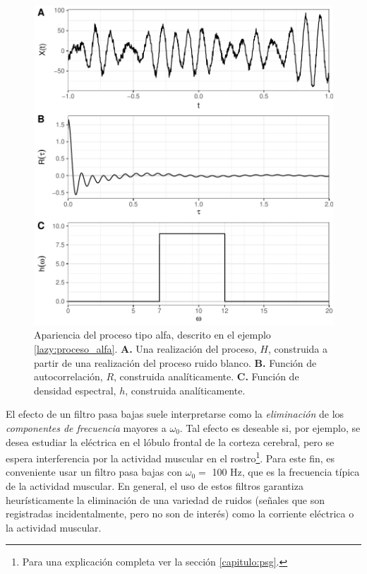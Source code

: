 \documentclass[12pt,letterpaper]{book}
\newcommand{\hz}{\si{\hertz}\xspace}
\begin{document}
\begin{figure}
\centering
\includegraphics[width=\linewidth]{./img_mas_ejemplos/proceso_alfa.pdf}
\caption[Apariencia del proceso tipo alfa]{Apariencia del proceso tipo alfa, descrito en el ejemplo \ref{lazy:proceso_alfa}. \textbf{A.} Una realización del proceso, $H$, construida a partir de una realización del proceso ruido blanco. \textbf{B.} Función de autocorrelación, $R$, construida analíticamente. \textbf{C.} Función de densidad espectral, $h$, construida analíticamente.}
\label{img:proceso_alfa}
\end{figure}

El efecto de un filtro pasa bajas suele interpretarse como la \textit{eliminación} de los \textit{componentes de frecuencia} mayores a $\omega_0$. 
%
Tal efecto es deseable si, por ejemplo, se desea estudiar la eléctrica en el lóbulo frontal de la corteza cerebral, pero se espera interferencia por la actividad muscular en el rostro\footnote{Para una explicación completa ver la sección \ref{capitulo:psg}.}.
%
Para este fin, es conveniente usar un filtro pasa bajas con $\omega_0 = $ 100 \hz, que es la frecuencia típica de la actividad muscular.
%
En general, el uso de estos filtros garantiza heurísticamente la eliminación de una variedad de ruidos (señales que son registradas incidentalmente, pero no son de interés) como la corriente eléctrica o la actividad muscular.
\end{document}
